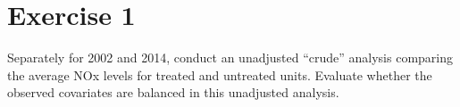 
\section{Exercise 1}

\begin{quoting}
  Separately for 2002 and 2014, conduct an unadjusted “crude” analysis
  comparing the average NOx levels for treated and untreated
  units. Evaluate whether the observed covariates are balanced in this
  unadjusted analysis.
\end{quoting}


